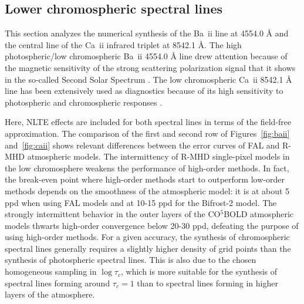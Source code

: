 \documentclass[iop,numberedappendix,twocolappendix,twocolumn]{emulateapj}
\begin{document}
\subsection{Lower chromospheric spectral lines}\label{subsec:5.2}
%
This section analyzes the numerical synthesis of the Ba~{\sc ii} line at 4554.0 {\rm \AA} and the central line of the Ca~{\sc ii} infrared triplet at 8542.1 {\rm \AA}.
The high photospheric/low chromospheric Ba~{\sc ii} 4554.0 {\rm \AA} line drew attention because of the magnetic sensitivity
of the strong scattering polarization signal that it shows in the so-called Second Solar Spectrum \citep[e.g.,][]{stenflo1997,belluzzi2007,faurobert2009,ramelli2009,smitha2013}.
The low chromospheric Ca~{\sc ii} 8542.1 {\rm \AA} line has been extensively used as diagnostics because of its high sensitivity to photospheric and chromospheric responses \citep{delacruz_rodriguez+piskunov2013,quintero2016}.

Here, NLTE effects are included for both spectral lines in terms of the field-free approximation. 
The comparison of the first and second row of Figures~\ref{fig:baii} and~\ref{fig:caii} shows relevant differences between the error curves
of FAL and R-MHD atmospheric models.
The intermittency of R-MHD single-pixel models in the low chromosphere 
weakens the performance of high-order methods.
In fact, the break-even point where high-order methods start to outperform
low-order methods depends on the smoothness of the atmospheric model:
it is at about 5 ppd when using FAL models and at 10-15 ppd for the Bifrost-2 model.
The strongly intermittent behavior in the outer layers of the CO$^5$BOLD atmospheric models
thwarts high-order convergence below 20-30 ppd, defeating the purpose of using high-order methods.
For a given accuracy, the synthesis of chromospheric spectral lines generally requires a slightly higher density of grid points
than the synthesis of photospheric spectral lines.
This is also due to the chosen homogeneous sampling in $\log \tau_c$, which is more suitable
for the synthesis of spectral lines forming around $\tau_c=1$ than to spectral lines forming in higher layers of the atmosphere.
\end{document}
